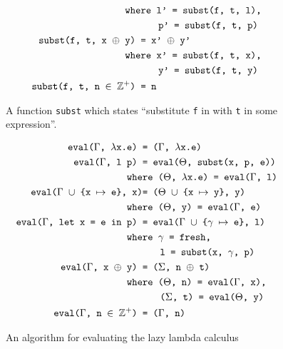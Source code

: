 \begin{figure}[p]
\begin{mdframed}
\begin{align}
  \texttt{whe}&\texttt{re l' = subst(f, t, l),}\tag*{}\\
  &\hspace{0.62cm}\texttt{p' = subst(f, t, p)}\tag*{}\\
  \texttt{subst(f, t, x $\oplus$ y) }&\texttt{= x' $\oplus$ y'}\tag*{}\\
  \texttt{whe}&\texttt{re x' = subst(f, t, x),}\tag*{}\\
  &\hspace{0.62cm}\texttt{y' = subst(f, t, y)}\tag*{}\\
  \texttt{subst(f, t, n $\in$ $\mathbb{Z}^+$) }&\texttt{= n}\tag*{}
\end{align}
\end{mdframed}
  \caption{A function \texttt{subst} which states ``substitute \texttt{f} in with \texttt{t} in some expression''.}
  \label{fig:eval:subst}
\end{figure}
\begin{figure}[p]
\begin{mdframed}[style=style1]
\begin{align}
  \texttt{eval($\Gamma$, $\lambda$x.e) }&\texttt{= ($\Gamma$, $\lambda$x.e)}\tag*{}\\
  \texttt{eval($\Gamma$, l p) }&\texttt{= eval($\Theta$, subst(x, p, e))}\tag*{}\\
  \texttt{whe}&\texttt{re ($\Theta$, $\lambda$x.e) = eval($\Gamma$, l)}\tag*{}\\
  \texttt{eval($\Gamma$ $\cup$ \{x $\mapsto$ e\}, x)}&\texttt{= ($\Theta$ $\cup$ \{x $\mapsto$ y\}, y)}\tag*{}\\
  \texttt{whe}&\texttt{re ($\Theta$, y) = eval($\Gamma$, e)}\tag*{}\\
  \texttt{eval($\Gamma$, let x = e in p) }&\texttt{= eval($\Gamma$ $\cup$ \{$\gamma$ $\mapsto$ e\}, l)}\tag*{}\\
  \texttt{whe}&\texttt{re $\gamma$ = fresh,}\tag*{}\\
  &\hspace{0.62cm}\texttt{l = subst(x, $\gamma$, p)}\tag*{}\\
  \texttt{eval($\Gamma$, x $\oplus$ y) }&\texttt{= ($\Sigma$, n $\oplus$ t)}\tag*{}\\
  \texttt{whe}&\texttt{re ($\Theta$, n) = eval($\Gamma$, x),}\tag*{}\\
  &\hspace{0.62cm}\texttt{($\Sigma$, t) = eval($\Theta$, y)}\tag*{}\\
  \texttt{eval($\Gamma$, n $\in$ $\mathbb{Z^+}$) }&\texttt{= ($\Gamma$, n)}\tag*{}
\end{align}
\end{mdframed}
  \caption{An algorithm for evaluating the lazy lambda calculus}
  \label{fig:eval:laznaive}
\end{figure}
